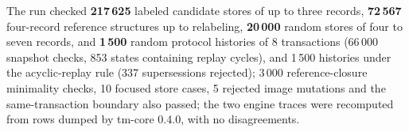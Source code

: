 \par\noindent The run checked \textbf{217\,625} labeled candidate stores of up to three records, \textbf{72\,567} four-record reference structures up to relabeling, \textbf{20\,000} random stores of four to seven records, and \textbf{1\,500} random protocol histories of 8 transactions (66\,000 snapshot checks, 853 states containing replay cycles), and 1\,500 histories under the acyclic-replay rule (337 supersessions rejected); 3\,000 reference-closure minimality checks, 10 focused store cases, 5 rejected image mutations and the same-transaction boundary also passed; the two engine traces were recomputed from rows dumped by tm-core 0.4.0, with no disagreements.\par
